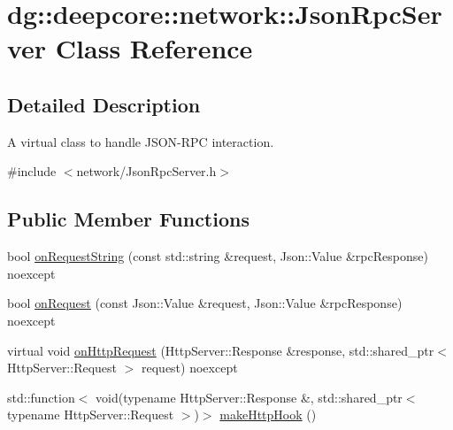 \hypertarget{classdg_1_1deepcore_1_1network_1_1_json_rpc_server}{}\section{dg\+:\+:deepcore\+:\+:network\+:\+:Json\+Rpc\+Server Class Reference}
\label{classdg_1_1deepcore_1_1network_1_1_json_rpc_server}


\subsection{Detailed Description}
A virtual class to handle J\+S\+O\+N-\/\+R\+PC interaction. 

{\ttfamily \#include $<$network/\+Json\+Rpc\+Server.\+h$>$}

\subsection*{Public Member Functions}
\begin{DoxyCompactItemize}
\item 
bool \hyperlink{classdg_1_1deepcore_1_1network_1_1_json_rpc_server_afdf48f480c38c0323ede59f0a4f34a46}{on\+Request\+String} (const std\+::string \&request, Json\+::\+Value \&rpc\+Response) noexcept
\item 
bool \hyperlink{classdg_1_1deepcore_1_1network_1_1_json_rpc_server_a1223e51df1a94dbfc4f191a6d40bf7b8}{on\+Request} (const Json\+::\+Value \&request, Json\+::\+Value \&rpc\+Response) noexcept
\item 
virtual void \hyperlink{classdg_1_1deepcore_1_1network_1_1_json_rpc_server_a1cd378978887971fb20ae14b09b08d2c}{on\+Http\+Request} (Http\+Server\+::\+Response \&response, std\+::shared\+\_\+ptr$<$ Http\+Server\+::\+Request $>$ request) noexcept
\item 
std\+::function$<$ void(typename Http\+Server\+::\+Response \&, std\+::shared\+\_\+ptr$<$ typename Http\+Server\+::\+Request $>$)$>$ \hyperlink{classdg_1_1deepcore_1_1network_1_1_json_rpc_server_a9066e03b8dd9ef6e781447e6fbf90a78}{make\+Http\+Hook} ()
\end{DoxyCompactItemize}
